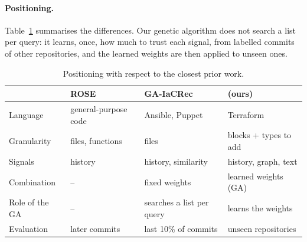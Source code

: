 \paragraph{Positioning.} Table~\ref{tab:positioning} summarises the differences. Our genetic
algorithm does not search a list per query: it learns, once, how much to trust each signal, from
labelled commits of other repositories, and the learned weights are then applied to unseen ones.

\begin{table}[ht]
\centering
\small
\caption{Positioning with respect to the closest prior work.}
\label{tab:positioning}
\begin{tabular}{@{}llll@{}}
\toprule
 & ROSE~\cite{zimmermann2004rose} & GA-IaCRec~\cite{bessghaier2026iacrec} & \tool{} (ours) \\
\midrule
Language          & general-purpose code   & Ansible, Puppet              & Terraform \\
Granularity       & files, functions       & files                        & blocks + types to add \\
Signals           & history                & history, similarity          & history, graph, text \\
Combination       & --                     & fixed weights                & learned weights (GA) \\
Role of the GA    & --                     & searches a list per query    & learns the weights \\
Evaluation        & later commits          & last 10\% of commits         & unseen repositories \\
\bottomrule
\end{tabular}
\end{table}
